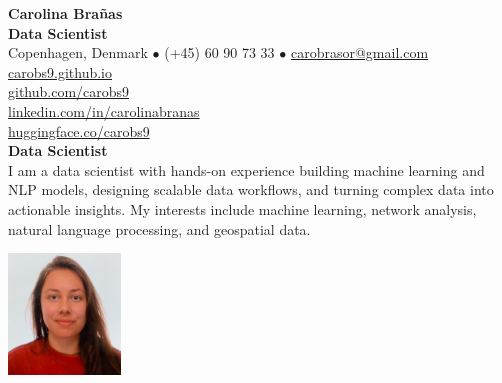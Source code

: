\documentclass{resume}
\begin{document}
\vspace{-2em}
\begin{minipage}{0.75\textwidth}
    \raggedright
    {\Huge \textbf{Carolina Brañas}}\\[0.4em]
    {\normalsize \textbf{Data Scientist}}\\[0.8em]
    {\small
    Copenhagen, Denmark $\bullet$
    (+45) 60 90 73 33 $\bullet$
    \href{mailto:carobrasor@gmail.com}{carobrasor@gmail.com} \\[0.25em]
    \href{https://carobs9.github.io/}{carobs9.github.io} \\[0.25em]
    \href{https://github.com/carobs9}{github.com/carobs9} \\[0.25em]
    \href{https://www.linkedin.com/in/carolinabranas/}{linkedin.com/in/carolinabranas} \\[0.25em]
    \href{https://huggingface.co/carobs9}{huggingface.co/carobs9}
    }\\[1em]
    {\normalsize \textbf{Data Scientist}}\\[0.5em]
    I am a data scientist with hands-on experience building machine learning and NLP models, designing scalable data workflows, and turning complex data into actionable insights. 
    My interests include machine learning, network analysis, natural language processing, and geospatial data. \\
\end{minipage}
\hfill
\begin{minipage}{0.23\textwidth}
    \begin{flushright}
        \includegraphics[width=3cm]{profile.jpg}
    \end{flushright}
\end{minipage}
\vspace{1em}

\end{document}

